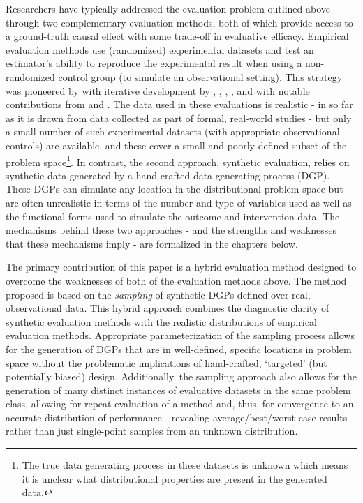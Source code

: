\documentclass[../main.tex]{subfiles}
\begin{document}
\vspace{\baselineskip}
Researchers have typically addressed the evaluation problem outlined above through two complementary evaluation methods, both of which provide access to a ground-truth causal effect with some trade-off in evaluative efficacy. Empirical evaluation methods use (randomized) experimental datasets and test an estimator’s ability to reproduce the experimental result when using a non-randomized control group (to simulate an observational setting). This strategy was pioneered by \textcite{Lalonde1986EvaluatingData} with iterative development by \textcite{Heckman1998MatchingEstimator}, \textcite{Dehejia1999CausalPrograms}, \textcite{Dehejia2002PropensityStudies}, \textcite{Dehejia2005PracticalTodd}, and \textcite{Smith2005DoesEstimators} with notable contributions from \textcite{Hill2005AAnalyses} and \textcite{Shadish2008CanAssignments}. The data used in these evaluations is realistic - in so far as it is drawn from data collected as part of formal, real-world studies - but only a small number of such experimental datasets (with appropriate observational controls) are available, and these cover a small and poorly defined subset of the problem space\footnote{ The true data generating process in these datasets is unknown which means it is unclear what distributional properties are present in the generated data.}. In contrast, the second approach, synthetic evaluation, relies on synthetic data generated by a hand-crafted data generating process (DGP). These DGPs can simulate any location in the distributional problem space but are often unrealistic in terms of the number and type of variables used as well as the functional forms used to simulate the outcome and intervention data. The mechanisms behind these two approaches - and the strengths and weaknesses that these mechanisms imply - are formalized in the chapters below.\par


\vspace{\baselineskip}
The primary contribution of this paper is a hybrid evaluation method designed to overcome the weaknesses of both of the evaluation methods above. The method proposed is based on the \textit{sampling} of synthetic DGPs defined over real, observational data. This hybrid approach combines the diagnostic clarity of synthetic evaluation methods with the realistic distributions of empirical evaluation methods. Appropriate parameterization of the sampling process allows for the generation of DGPs that are in well-defined, specific locations in problem space without the problematic implications of hand-crafted, ‘targeted’ (but potentially biased) design. Additionally, the sampling approach also allows for the generation of many distinct instances of evaluative datasets in the same problem class, allowing for repeat evaluation of a method and, thus, for convergence to an accurate distribution of performance - revealing average/best/worst case results rather than just single-point samples from an unknown distribution.\par
\end{document}

